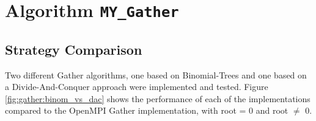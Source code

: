 
\newcommand\mygather{\texttt{MY\_Gather}\xspace}
\newcommand\myscatter{\texttt{MY\_Scatter}\xspace}

\newcommand\mpigather{\texttt{MPI\_Gather}\xspace}
\newcommand\mpiscatter{\texttt{MPI\_Scatter}\xspace}

\section{Algorithm \mygather}

\subsection{Strategy Comparison}

Two different Gather algorithms, one based on Binomial-Trees and one based on a Divide-And-Conquer approach were implemented and tested. Figure \ref{fig:gather:binom_vs_dac} shows the performance of each of the implementations compared to the OpenMPI Gather implementation, with root = 0 and root $\neq$ 0.

